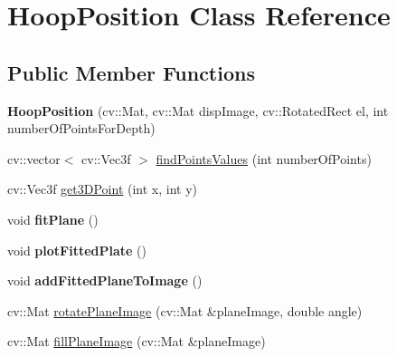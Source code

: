 \hypertarget{classHoopPosition}{
\section{HoopPosition Class Reference}
\label{classHoopPosition}
}
\subsection*{Public Member Functions}
\begin{DoxyCompactItemize}
\item 
\hypertarget{classHoopPosition_a16bf0bae8de490c22bee97dd6b4a7eb9}{
{\bfseries HoopPosition} (cv::Mat, cv::Mat dispImage, cv::RotatedRect el, int numberOfPointsForDepth)}
\label{classHoopPosition_a16bf0bae8de490c22bee97dd6b4a7eb9}

\item 
cv::vector$<$ cv::Vec3f $>$ \hyperlink{classHoopPosition_a20ee55da5edf2dcc8f6025bee7c732f9}{findPointsValues} (int numberOfPoints)
\item 
cv::Vec3f \hyperlink{classHoopPosition_a557a2efd60c963b5c608adec34d8a4c3}{get3DPoint} (int x, int y)
\item 
\hypertarget{classHoopPosition_afa5de685d826744f74e0c4c446f7a9ac}{
void {\bfseries fitPlane} ()}
\label{classHoopPosition_afa5de685d826744f74e0c4c446f7a9ac}

\item 
\hypertarget{classHoopPosition_ae739175a0973a6a2bc3ac7621f60328f}{
void {\bfseries plotFittedPlate} ()}
\label{classHoopPosition_ae739175a0973a6a2bc3ac7621f60328f}

\item 
\hypertarget{classHoopPosition_aa4fa3114c3f3dac87c569e9212948afc}{
void {\bfseries addFittedPlaneToImage} ()}
\label{classHoopPosition_aa4fa3114c3f3dac87c569e9212948afc}

\item 
cv::Mat \hyperlink{classHoopPosition_a2c5b2c808f5d6f5eb07ddddc8cca349a}{rotatePlaneImage} (cv::Mat \&planeImage, double angle)
\item 
cv::Mat \hyperlink{classHoopPosition_a0fb499507d77004d72777c0981d31cd5}{fillPlaneImage} (cv::Mat \&planeImage)
\end{DoxyCompactItemize}
